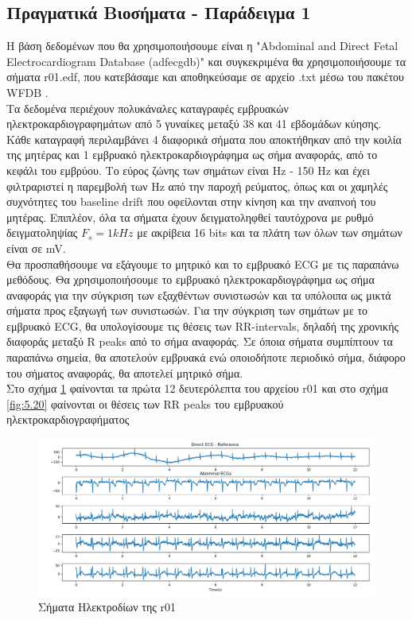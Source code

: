 \subsection{Πραγματικά Βιοσήματα - Παράδειγμα 1}
\justifying
Η βάση δεδομένων που θα χρησιμοποιήσουμε είναι η \en "Abdominal and Direct Fetal Electrocardiogram Database (adfecgdb)" \gr 
\cite{examples:20}\cite{examples:21}\cite{examples:22}
και συγκεκριμένα θα χρησιμοποιήσουμε τα σήματα \en r01.edf, \gr που κατεβάσαμε και αποθηκεύσαμε σε αρχείο \en .txt \gr μέσω του πακέτου \en WFDB \gr.
\\[0.5 \baselineskip]
Τα δεδομένα περιέχουν πολυκάναλες καταγραφές εμβρυακών ηλεκτροκαρδιογραφημάτων από 5 γυναίκες μεταξύ 38 και 41 εβδομάδων κύησης. Κάθε καταγραφή περιλαμβάνει 4 διαφορικά σήματα που αποκτήθηκαν από την κοιλία της μητέρας και 1 εμβρυακό ηλεκτροκαρδιογράφημα ως σήμα αναφοράς, από το κεφάλι του εμβρύου. Το εύρος ζώνης των σημάτων είναι  Hz - 150 Hz \gr και έχει φιλτραριστεί η παρεμβολή των  Hz \gr από την παροχή ρεύματος, όπως και οι χαμηλές συχνότητες του \en baseline drift \gr που οφείλονται στην κίνηση και την αναπνοή του μητέρας. Επιπλέον, όλα τα σήματα έχουν δειγματοληφθεί ταυτόχρονα με ρυθμό δειγματοληψίας \en $F_s = 1 kHz$ \gr με ακρίβεια 16 \en bits \gr και τα πλάτη των όλων των σημάτων είναι σε \en mV. \gr
\\ [0.5 \baselineskip]
Θα προσπαθήσουμε να εξάγουμε το μητρικό και το εμβρυακό \en ECG \gr με τις παραπάνω μεθόδους. Θα χρησιμοποιήσουμε το εμβρυακό ηλεκτροκαρδιογράφημα ως σήμα αναφοράς για την σύγκριση των εξαχθέντων συνιστωσών και τα υπόλοιπα ως μικτά σήματα προς εξαγωγή των συνιστωσών. Για την σύγκριση των σημάτων με το εμβρυακό \en ECG, \gr θα υπολογίσουμε τις θέσεις των \en RR-intervals, \gr δηλαδή της χρονικής διαφοράς μεταξύ \en R peaks \gr  από το σήμα αναφοράς. Σε όποια σήματα συμπίπτουν τα παραπάνω σημεία, θα αποτελούν εμβρυακά ενώ οποιοδήποτε περιοδικό σήμα, διάφορο του σήματος αναφοράς, θα αποτελεί μητρικό σήμα.
\\ [1.5 \baselineskip]
Στο σχήμα \ref{fig:5.19} φαίνονται τα πρώτα 12 δευτερόλεπτα του αρχείου \en r01 \gr και στο σχήμα \ref{fig:5.20} φαίνονται οι θέσεις των \en RR peaks \gr του εμβρυακού ηλεκτροκαρδιογραφήματος
\begin{figure}[H]
    \centering
    \includegraphics[width=\textwidth]{r01database/r01_12secs.png}
    \caption{Σήματα Ηλεκτροδίων της \en r01 \gr}
    \label{fig:5.19}
\end{figure}
